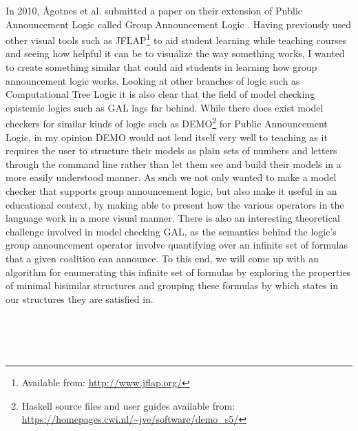 In 2010, Ågotnes et al. submitted a paper on their extension of Public Announcement Logic called Group Announcement Logic \cite{Agotnes2010}. Having previously used other visual tools such as JFLAP\footnote{Available from: \url{http://www.jflap.org/}} to aid student learning while teaching courses and seeing how helpful it can be to visualize the way something works, I wanted to create something similar that could aid students in learning how group announcement logic works. Looking at other branches of logic such as Computational Tree Logic it is also clear that the field of model checking epistemic logics such as GAL lags far behind. While there does exist model checkers for similar kinds of logic such as DEMO\footnote{Haskell source files and user guides available from: \url{https://homepages.cwi.nl/~jve/software/demo_s5/}} for Public Announcement Logic, in my opinion DEMO would not lend itself very well to teaching as it requires the user to structure their models as plain sets of numbers and letters through the command line rather than let them see and build their models in a more easily understood manner. As such we not only wanted to make a model checker that supports group announcement logic, but also make it useful in an educational context, by making able to present how the various operators in the language work in a more visual manner. There is also an interesting theoretical challenge involved in model checking GAL, as the semantics behind the logic's group announcement operator involve quantifying over an infinite set of formulas that a given coalition can announce. To this end, we will come up with an algorithm for enumerating this infinite set of formulas by exploring the properties of minimal bisimilar structures and grouping these formulas by which states in our structures they are satisfied in. 



\\
\\
\\

